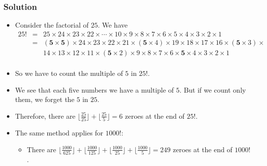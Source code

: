 \documentclass{beamer}
\newcommand{\cheflink}[2]{Code Chef (http://www.codechef.com)
  problem \href{#2}{\textcolor{blue}{#1}.}}
\newcounter{exo}
\newcommand{\exo}{
  \addtocounter{exo}{1}
  Exercice \arabic{exo}
}
\begin{document}
\fi


\ifanswers

\begin{frame}%
\frametitle{Solution}
\scriptsize

\begin{itemize}

\item<1-> Consider the factorial of $25$. We have
\begin{eqnarray*}
25! & = & 25\times24\times23\times22\times \cdots \times 10\times9\times8\times7\times6\times5\times4\times3\times2\times1\\
& = & (\textbf{5}\times\textbf{5}) \times 24 \times 23 \times 22 \times 21 \times (\textbf{5}\times4)\times19\times18\times17\times16 \times (\textbf{5}\times3) \times\\
&  & 14\times13\times12 \times 11 \times (\textbf{5}\times2)\times9\times8\times7\times6\times\textbf{5}\times4\times3\times2\times1\\
\end{eqnarray*}

\item<2-> So we have to count the multiple of $5$ in $25!$.
\vspace{0.2cm}

\item<2-> We see that each five numbers we have a multiple of $5$. But if we count only them, we forget the $5$ in $25$.
\vspace{0.2cm}

\item<2-> Therefore, there are $\lfloor\frac{25}{25}\rfloor + \lfloor\frac{25}{5}\rfloor = 6$ zeroes at the end of $25!$.
\vspace{0.2cm}

\item<3-> The same method applies for $1000!$:
\begin{itemize}
\scriptsize
\item There are $\lfloor\frac{1000}{625}\rfloor + \lfloor\frac{1000}{125}\rfloor + \lfloor\frac{1000}{25}\rfloor + \lfloor\frac{1000}{5}\rfloor = 249$ zeroes at the end of $1000!$.
\end{itemize}

\end{itemize}

\end{frame}
\end{document}
